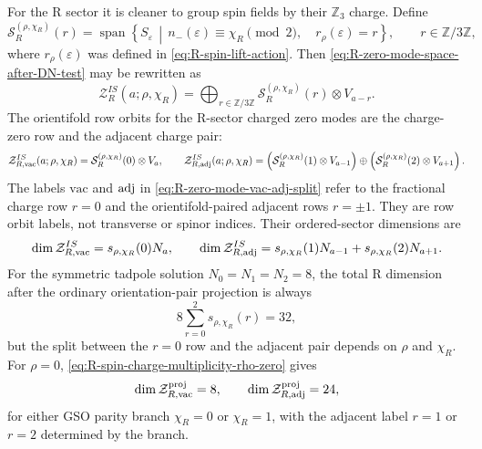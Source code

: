\documentclass[11pt]{article}
\newcommand{\Z}{\mathbb{Z}}
\newcommand{\vac}{\mathrm{vac}}
\begin{document}
For the R sector it is cleaner to group spin fields by their \(\Z_3\) charge. Define
\begin{equation}
  \mathcal S_{R}^{(\rho,\chi_R)}(r)
  =
  \operatorname{span}
  \left\{
    S_\varepsilon\,\middle|\,
    n_-(\varepsilon)\equiv \chi_R\!\!\pmod 2,\quad
    r_\rho(\varepsilon)=r
  \right\},
  \qquad r\in\Z/3\Z ,
  \label{eq:R-spin-charge-subspaces}
\end{equation}
where \(r_\rho(\varepsilon)\) was defined in \eqref{eq:R-spin-lift-action}. Then
\eqref{eq:R-zero-mode-space-after-DN-test} may be rewritten as
\begin{equation}
  \mathcal Z_R^{IS}(a;\rho,\chi_R)
  =
  \bigoplus_{r\in\Z/3\Z}
  \mathcal S_R^{(\rho,\chi_R)}(r)\otimes V_{a-r}.
  \label{eq:R-zero-mode-space-by-charge}
\end{equation}
The orientifold row orbits for the R-sector charged zero modes are the charge-zero row and the
adjacent charge pair:
\begin{equation}
  \mathcal Z_{R,\vac}^{IS}(a;\rho,\chi_R)
  =
  \mathcal S_R^{(\rho,\chi_R)}(0)\otimes V_a,
  \qquad
  \mathcal Z_{R,\rm adj}^{IS}(a;\rho,\chi_R)
  =
  \left(\mathcal S_R^{(\rho,\chi_R)}(1)\otimes V_{a-1}\right)
  \oplus
  \left(\mathcal S_R^{(\rho,\chi_R)}(2)\otimes V_{a+1}\right).
  \label{eq:R-zero-mode-vac-adj-split}
\end{equation}
The labels \(\vac\) and \(\rm adj\) in \eqref{eq:R-zero-mode-vac-adj-split} refer to the
fractional charge row \(r=0\) and the orientifold-paired adjacent rows \(r=\pm1\). They are row
orbit labels, not transverse or spinor indices. Their ordered-sector dimensions are
\begin{equation}
  \dim \mathcal Z_{R,\vac}^{IS}
  =
  s_{\rho,\chi_R}(0)N_a,
  \qquad
  \dim \mathcal Z_{R,\rm adj}^{IS}
  =
  s_{\rho,\chi_R}(1)N_{a-1}
  +
  s_{\rho,\chi_R}(2)N_{a+1}.
  \label{eq:R-zero-mode-vac-adj-dimensions}
\end{equation}
For the symmetric tadpole solution \(N_0=N_1=N_2=8\), the total R dimension after the ordinary
orientation-pair projection is always
\begin{equation}
  8\sum_{r=0}^{2}s_{\rho,\chi_R}(r)=32,
  \label{eq:R-symmetric-total-from-charge-multiplicities}
\end{equation}
but the split between the \(r=0\) row and the adjacent pair depends on \(\rho\) and \(\chi_R\).
For \(\rho=0\), \eqref{eq:R-spin-charge-multiplicity-rho-zero} gives
\begin{equation}
  \dim \mathcal Z_{R,\vac}^{\rm proj}=8,
  \qquad
  \dim \mathcal Z_{R,\rm adj}^{\rm proj}=24,
  \label{eq:R-rho-zero-symmetric-vac-adj-dimensions}
\end{equation}
for either GSO parity branch \(\chi_R=0\) or \(\chi_R=1\), with the adjacent label \(r=1\) or
\(r=2\) determined by the branch.
\end{document}

